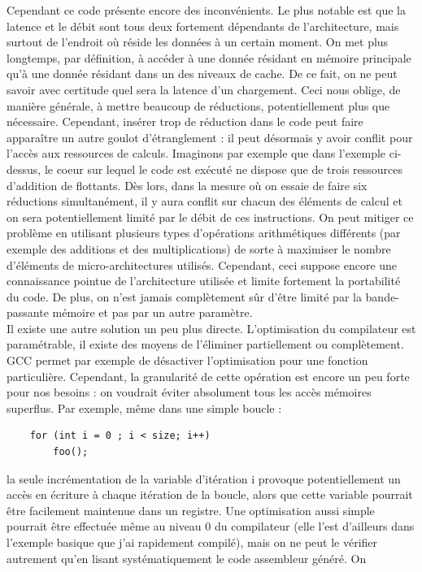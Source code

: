 \documentclass{report}
\begin{document}
Cependant ce code présente encore des inconvénients. Le plus notable est que la latence et le débit 
sont tous deux fortement dépendants de l'architecture, mais surtout de l'endroit où réside les données
à un certain moment. On met plus longtemps, par définition, à accéder à une donnée résidant en mémoire
principale qu'à une donnée résidant dans un des niveaux de cache. De ce fait, on ne peut savoir avec
certitude quel sera la latence d'un chargement. Ceci nous oblige, de manière générale, à mettre beaucoup
de réductions, potentiellement plus que nécessaire. Cependant, insérer trop de réduction dans le code
peut faire apparaître un autre goulot d'étranglement : il peut désormais y avoir conflit pour l'accès 
aux ressources de calculs. Imaginons par exemple que dans l'exemple ci-dessus, le coeur sur 
lequel le code est exécuté ne dispose que de trois ressources d'addition de flottants. Dès lors, dans
la mesure où on essaie de faire six réductions simultanément, il y aura conflit sur chacun des éléments
de calcul et on sera potentiellement limité par le débit de ces instructions. On peut mitiger ce 
problème en utilisant plusieurs types d'opérations arithmétiques différents (par exemple des additions
et des multiplications) de sorte à maximiser le nombre d'éléments de micro-architectures utilisés.
Cependant, ceci suppose encore une connaissance pointue de l'architecture utilisée et limite 
fortement la portabilité du code. De plus, on n'est jamais complètement sûr d'être limité par
la bande-passante mémoire et pas par un autre paramètre.
\\Il existe une autre solution un peu plus directe. L'optimisation du compilateur est paramétrable,
il existe des moyens de l'éliminer partiellement ou complètement. GCC permet par exemple de désactiver
l'optimisation pour une fonction particulière. Cependant, la granularité de cette opération est encore
un peu forte pour nos besoins : on voudrait éviter absolument tous les accès mémoires superflus. Par 
exemple, même dans une simple boucle : 
\begin{lstlisting}
    for (int i = 0 ; i < size; i++)
        foo();
\end{lstlisting}
la seule incrémentation de la variable d'itération i provoque potentiellement un accès en écriture
à chaque itération de la boucle, alors que cette variable pourrait être facilement maintenue
dans un registre. Une optimisation aussi simple pourrait être effectuée même au niveau
0 du compilateur (elle l'est d'ailleurs dans l'exemple basique que j'ai rapidement compilé), 
mais on ne peut le vérifier autrement qu'en lisant systématiquement le code assembleur généré. On
\end{document}
